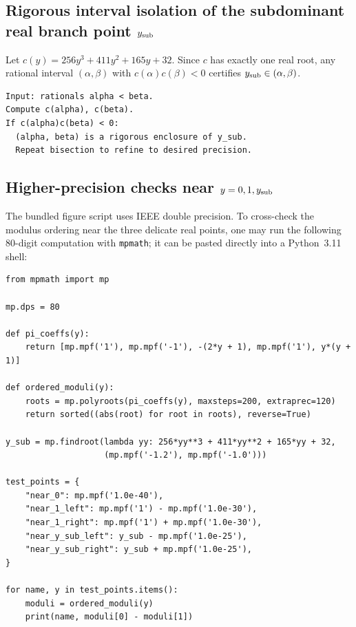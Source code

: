 \subsection{Rigorous interval isolation of the subdominant real branch point \texorpdfstring{\(y_{\mathrm{sub}}\)}{ySub}}

Let \(c(y)=256y^3+411y^2+165y+32\).
Since \(c\) has exactly one real root, any rational interval \((\alpha,\beta)\) with
\(c(\alpha)c(\beta)<0\) certifies \(y_{\mathrm{sub}}\in(\alpha,\beta)\).

\begin{verbatim}
Input: rationals alpha < beta.
Compute c(alpha), c(beta).
If c(alpha)c(beta) < 0:
  (alpha, beta) is a rigorous enclosure of y_sub.
  Repeat bisection to refine to desired precision.
\end{verbatim}

\subsection{Higher-precision checks near \texorpdfstring{\(y=0,1,y_{\mathrm{sub}}\)}{y=0,1,ySub}}\label{subsec:higher-precision}

The bundled figure script uses IEEE double precision.
To cross-check the modulus ordering near the three delicate real points, one may run the following \(80\)-digit computation with \texttt{mpmath}; it can be pasted directly into a Python~3.11 shell:

\begin{verbatim}
from mpmath import mp

mp.dps = 80

def pi_coeffs(y):
    return [mp.mpf('1'), mp.mpf('-1'), -(2*y + 1), mp.mpf('1'), y*(y + 1)]

def ordered_moduli(y):
    roots = mp.polyroots(pi_coeffs(y), maxsteps=200, extraprec=120)
    return sorted((abs(root) for root in roots), reverse=True)

y_sub = mp.findroot(lambda yy: 256*yy**3 + 411*yy**2 + 165*yy + 32,
                    (mp.mpf('-1.2'), mp.mpf('-1.0')))

test_points = {
    "near_0": mp.mpf('1.0e-40'),
    "near_1_left": mp.mpf('1') - mp.mpf('1.0e-30'),
    "near_1_right": mp.mpf('1') + mp.mpf('1.0e-30'),
    "near_y_sub_left": y_sub - mp.mpf('1.0e-25'),
    "near_y_sub_right": y_sub + mp.mpf('1.0e-25'),
}

for name, y in test_points.items():
    moduli = ordered_moduli(y)
    print(name, moduli[0] - moduli[1])
\end{verbatim}

